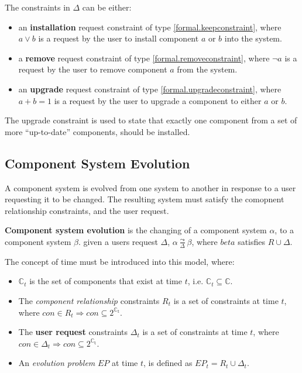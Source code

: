 The constraints in $\Delta$ can be either:
\begin{itemize}
  \item an \textbf{installation} request constraint of type \ref{formal.keepconstraint}, where $a \vee b$ is a request by the user to install component $a$ or $b$ into the system.
  \item a \textbf{remove} request constraint of type \ref{formal.removeconstraint}, where $\neg a$ is a request by the user to remove component $a$ from the system.
  \item an \textbf{upgrade} request constraint of type \ref{formal.upgradeconstraint}, where $a + b = 1$ is a request by the user to upgrade a component to either $a$ or $b$.
\end{itemize} 
The upgrade constraint is used to state that exactly one component from a set of more ``up-to-date'' components, should be installed.


\subsection{Component System Evolution}
\label{formal.evo}
A component system is evolved from one system to another in response to a user requesting it to be changed.
The resulting system must satisfy the comopnent relationship constraints, and the user request.
\begin{defs}
\textbf{Component system evolution} is the changing of a component system $\alpha$, to a component system $\beta$.
given a users request $\Delta$, $\alpha \frac{\leadsto}{\Delta} \beta$, where $beta$ satisfies $R \cup \Delta$.
\end{defs}


The concept of time must be introduced into this model, where:
\begin{itemize}
  \item $\mathbb{C}_t$ is the set of components that exist at time $t$, i.e. $\mathbb{C}_t \subseteq \mathbb{C}$.
  \item The \textit{component relationship} constraints $R_t$ is a set of constraints at time $t$, where $con \in R_t \Rightarrow con \subseteq 2^{\mathbb{C_t}}$.
  \item The \textbf{user request} constraints $\Delta_t$ is a set of constraints at time $t$, where $con \in \Delta_t \Rightarrow con \subseteq 2^{\mathbb{C_t}}$.
  \item An \textit{evolution problem} $EP$ at time $t$, is defined as $EP_t = R_t \cup \Delta_t$.
\end{itemize}

